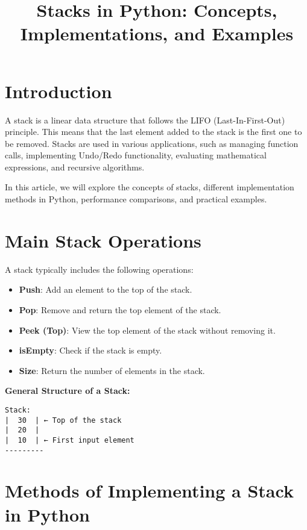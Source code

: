 \documentclass{article}
\title{Stacks in Python: Concepts, Implementations, and Examples}
\author{}
\date{}
\begin{document}
\maketitle

\section{Introduction}

A stack is a linear data structure that follows the LIFO (Last-In-First-Out) principle. This means that the last element added to the stack is the first one to be removed. Stacks are used in various applications, such as managing function calls, implementing Undo/Redo functionality, evaluating mathematical expressions, and recursive algorithms.

In this article, we will explore the concepts of stacks, different implementation methods in Python, performance comparisons, and practical examples.

\section{Main Stack Operations}

A stack typically includes the following operations:

\begin{itemize}
    \item \textbf{Push}: Add an element to the top of the stack.
    \item \textbf{Pop}: Remove and return the top element of the stack.
    \item \textbf{Peek (Top)}: View the top element of the stack without removing it.
    \item \textbf{isEmpty}: Check if the stack is empty.
    \item \textbf{Size}: Return the number of elements in the stack.
\end{itemize}

\textbf{General Structure of a Stack:}

\begin{verbatim}
Stack:
|  30  | ← Top of the stack
|  20  |
|  10  | ← First input element
---------
\end{verbatim}

\section{Methods of Implementing a Stack in Python}
\end{document}
